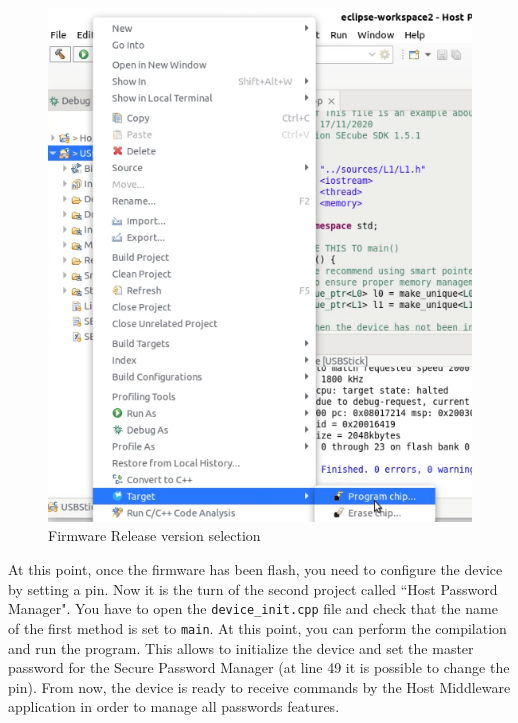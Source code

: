 \begin{figure}[H]
	\centering
	\includegraphics[width=0.55\linewidth]{images/firmware/setup_11}
	\caption{Firmware Release version selection}
	\label{fig:setup12}
\end{figure}

At this point, once the firmware has been flash, you need to configure the device by setting a pin. Now it is the turn of the second project called ``Host Password Manager".\newline\newline
You have to open the \texttt{device\_init.cpp} file and check that the name of the first method is set to \texttt{main}. At this point, you can perform the compilation and run the program. This allows to initialize the device and set the master password for the Secure Password Manager (at line 49 it is possible to change the pin). From now, the device is ready to receive commands by the Host Middleware application in order to manage all passwords features.






